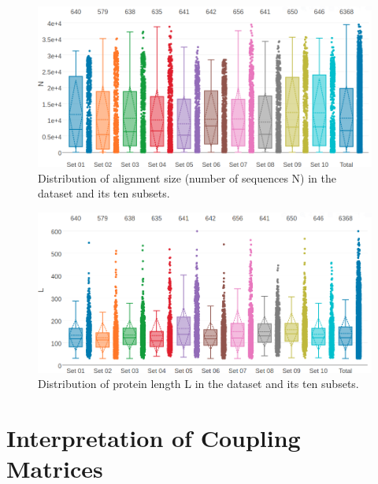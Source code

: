 \documentclass[11pt,a4paper,twoside]{book}
\theoremstyle{definition}
\theoremstyle{definition}
\theoremstyle{remark}
\begin{document}
\begin{figure}

{\centering \includegraphics[width=1\linewidth]{img/dataset_statistics/msa_size_dataset_boxplot_notitle} 

}

\caption{Distribution of alignment size (number of
sequences N) in the dataset and its ten subsets.}\label{fig:dataset-alignment-size}
\end{figure}




\begin{figure}

{\centering \includegraphics[width=1\linewidth]{img/dataset_statistics/protein_length_dataset_boxplot_notitle} 

}

\caption{Distribution of protein length L in the
dataset and its ten subsets.}\label{fig:dataset-protein-length}
\end{figure}

\chapter{Interpretation of Coupling
Matrices}\label{interpretation-of-coupling-matrices}
\end{document}
